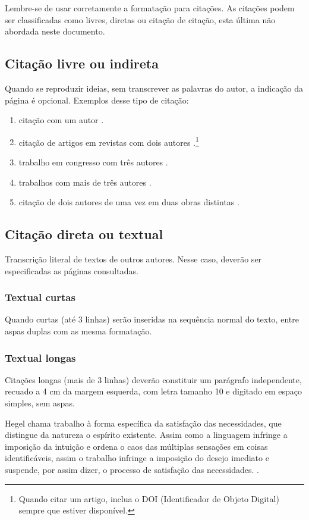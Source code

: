 Lembre-se de usar corretamente a formatação para citações. As citações podem ser classificadas como livres, diretas ou citação de citação, esta última não abordada neste documento.


\subsection{\esp Citação livre ou indireta}

Quando se reproduzir ideias, sem transcrever as palavras do autor, a indicação da página é opcional. Exemplos desse tipo de citação:
\begin{enumerate} 
 \item citação com um autor \cite{knuth1968}. 
 \item citação de artigos em revistas com dois autores \cite{prenner2022}.\footnote{Quando citar um artigo, inclua o DOI (Identificador de Objeto Digital) sempre que estiver disponível.}
  \item trabalho em congresso com três autores \cite{vasconcelos2016}.
 \item trabalhos com mais de três autores \cite{cap-livro2005}.
 \item citação de dois autores de uma vez em duas obras distintas \cite{gil2022,groupp2003}.
\end{enumerate}

\subsection{\esp Citação direta ou textual}

Transcrição literal de textos de outros autores. Nesse caso, deverão ser especificadas as páginas consultadas. 


\subsubsection{\esp Textual curtas}

Quando curtas (até 3 linhas) serão inseridas na sequência normal do texto, entre aspas duplas com as mesma formatação.

\subsubsection{\esp Textual longas}

Citações longas (mais de 3 linhas) deverão constituir um parágrafo independente, recuado a 4 cm da margem esquerda, 
com letra tamanho 10 e digitado em espaço simples, sem aspas.
\begin{citacaodireta}
Hegel chama trabalho à forma específica da satisfação das necessidades, que
distingue da natureza o espírito existente. Assim como a linguagem infringe
a imposição da intuição e ordena o caos das múltiplas sensações em coisas
identificáveis, assim o trabalho infringe a imposição do \hspace{0.1cm}desejo \hspace{0.1cm}imediato \hspace{0.1cm}e
suspende, por assim dizer, o processo de satisfação das necessidades.
\cite[25]{habermas1997}.
\end{citacaodireta}


